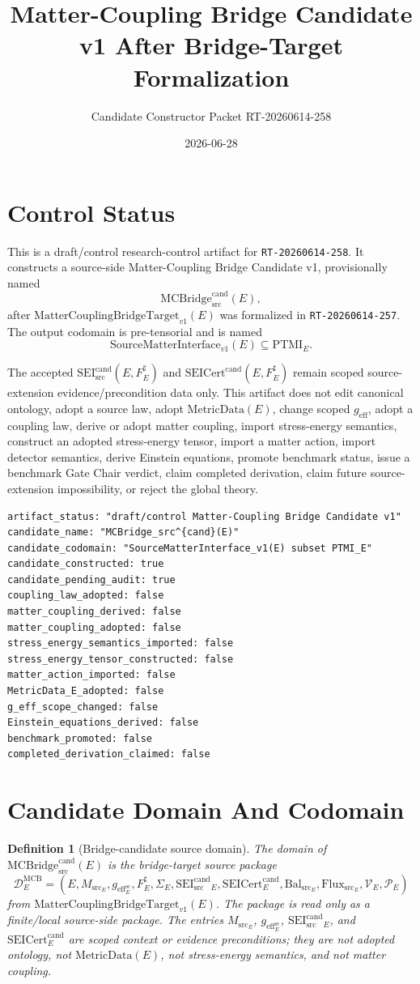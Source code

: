 \documentclass[11pt]{article}
\title{Matter-Coupling Bridge Candidate v1 After Bridge-Target Formalization}
\author{Candidate Constructor Packet RT-20260614-258}
\date{2026-06-28}
\newcommand{\MetricData}{\mathrm{MetricData}}
\newcommand{\geff}{g_{\mathrm{eff}}}
\newcommand{\Msrc}{M_{\mathrm{src}}}
\newcommand{\SEICand}{\mathrm{SEI}_{\mathrm{src}}^{\mathrm{cand}}}
\newcommand{\SEICertCand}{\mathrm{SEICert}^{\mathrm{cand}}}
\newcommand{\MCBT}{\mathrm{MatterCouplingBridgeTarget}_{v1}}
\newcommand{\MCBridgeCand}{\mathrm{MCBridge}_{\mathrm{src}}^{\mathrm{cand}}}
\newcommand{\SMI}{\mathrm{SourceMatterInterface}_{v1}}
\newcommand{\PTMI}{\mathrm{PTMI}}
\newcommand{\BalSrc}{\mathrm{Bal}_{\mathrm{src}}}
\newcommand{\FluxSrc}{\mathrm{Flux}_{\mathrm{src}}}
\newtheorem{definition}{Definition}
\begin{document}
\maketitle

\section{Control Status}

This is a draft/control research-control artifact for
\texttt{RT-20260614-258}. It constructs a source-side Matter-Coupling Bridge
Candidate v1, provisionally named
\[
  \MCBridgeCand(E),
\]
after \(\MCBT(E)\) was formalized in \texttt{RT-20260614-257}. The output
codomain is pre-tensorial and is named
\[
  \SMI(E) \subseteq \PTMI_E.
\]

The accepted \(\SEICand(E,F_E^\sharp)\) and
\(\SEICertCand(E,F_E^\sharp)\) remain scoped source-extension
evidence/precondition data only. This artifact does not edit canonical
ontology, adopt a source law, adopt \(\MetricData(E)\), change scoped
\(\geff\), adopt a coupling law, derive or adopt matter coupling, import
stress-energy semantics, construct an adopted stress-energy tensor, import a
matter action, import detector semantics, derive Einstein equations, promote
benchmark status, issue a benchmark Gate Chair verdict, claim completed
derivation, claim future source-extension impossibility, or reject the global
theory.

\begin{verbatim}
artifact_status: "draft/control Matter-Coupling Bridge Candidate v1"
candidate_name: "MCBridge_src^{cand}(E)"
candidate_codomain: "SourceMatterInterface_v1(E) subset PTMI_E"
candidate_constructed: true
candidate_pending_audit: true
coupling_law_adopted: false
matter_coupling_derived: false
matter_coupling_adopted: false
stress_energy_semantics_imported: false
stress_energy_tensor_constructed: false
matter_action_imported: false
MetricData_E_adopted: false
g_eff_scope_changed: false
Einstein_equations_derived: false
benchmark_promoted: false
completed_derivation_claimed: false
\end{verbatim}

\section{Candidate Domain And Codomain}

\begin{definition}[Bridge-candidate source domain]
The domain of \(\MCBridgeCand(E)\) is the bridge-target source package
\[
  \mathcal{D}^{\mathrm{MCB}}_E =
  (E,\Msrc_E,\geff_E^{\mathrm{sc}},F_E^\sharp,\Sigma_E,
  \SEICand_E,\SEICertCand_E,\BalSrc_E,\FluxSrc_E,\mathcal{V}_E,
  \mathcal{P}_E)
\]
from \(\MCBT(E)\). The package is read only as a finite/local source-side
package. The entries \(\Msrc_E\), \(\geff_E^{\mathrm{sc}}\),
\(\SEICand_E\), and \(\SEICertCand_E\) are scoped context or evidence
preconditions; they are not adopted ontology, not \(\MetricData(E)\), not
stress-energy semantics, and not matter coupling.
\end{definition}
\end{document}
